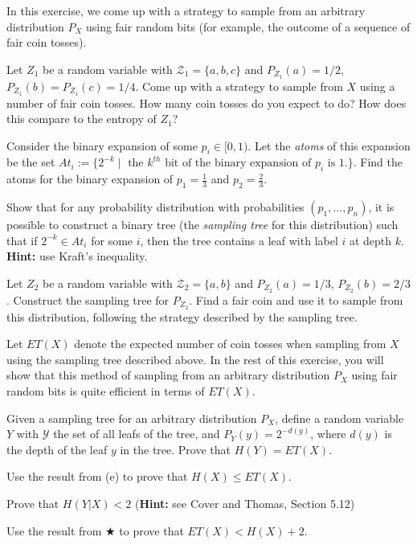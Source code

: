 \documentclass[a4paper,10pt,landscape,twocolumn]{scrartcl}
\begin{document}
\begin{exercise}
In this exercise, we come up with a strategy to sample from an arbitrary distribution $P_X$ using fair random bits (for example, the outcome of a sequence of fair coin tosses).
	\begin{subex}
	Let $Z_1$ be a random variable with $\mathcal{Z}_1 = \{a,b,c\}$ and $P_{Z_1}(a) = 1/2$, $P_{Z_1}(b) = P_{Z_1}(c) = 1/4$. Come up with a strategy to sample from $X$ using a number of fair coin tosses. How many coin tosses do you expect to do? How does this compare to the entropy of $Z_1$?
	\end{subex}
	\begin{subex}
	Consider the binary expansion of some $p_i \in [0,1)$. Let the \emph{atoms} of this expansion be the set $At_i := \{2^{-k} \mid \mbox{ the } k^{th} \mbox{ bit of the binary expansion of } p_i \mbox{ is 1.}\}$. Find the atoms for the binary expansion of $p_1 = \frac{1}{3}$ and $p_2 = \frac{2}{3}$.
	\end{subex}
	\begin{subex}
	Show that for any probability distribution with probabilities $(p_1, ..., p_n)$, it is possible to construct a binary tree (the \emph{sampling tree} for this distribution) such that if $2^{-k} \in At_i$ for some $i$, then the tree contains a leaf with label $i$ at depth $k$. \textbf{Hint:} use Kraft's inequality.
	\end{subex}
	\begin{subex}
	Let $Z_2$ be a random variable with $\mathcal{Z}_2 = \{a,b\}$ and $P_{Z_2}(a) = 1/3$, $P_{Z_2}(b) = 2/3$. Construct the sampling tree for $P_{Z_2}$. Find a fair coin and use it to sample from this distribution, following the strategy described by the sampling tree.
	\end{subex}
Let $ET(X)$ denote the expected number of coin tosses when sampling from $X$ using the sampling tree described above. In the rest of this exercise, you will show that this method of sampling from an arbitrary distribution $P_X$ using fair random bits is quite efficient in terms of $ET(X)$.
	\begin{subex}
	Given a sampling tree for an arbitrary distribution $P_X$, define a random variable $Y$ with $\mathcal{Y}$ the set of all leafs of the tree, and $P_Y(y) = 2^{-d(y)}$, where $d(y)$ is the depth of the leaf $y$ in the tree. Prove that $H(Y) = ET(X)$.
	\end{subex}
	\begin{subex}
	Use the result from (e) to prove that $H(X) \leq ET(X)$.
	\end{subex}
	\begin{subex**}
	Prove that $H(Y|X) < 2$ (\textbf{Hint:} see Cover and Thomas, Section 5.12)
	\end{subex**}
	\begin{subex}
	Use the result from $\bigstar$ to prove that $ET(X) < H(X) + 2$.
	\end{subex}
\end{exercise}
\end{document}
